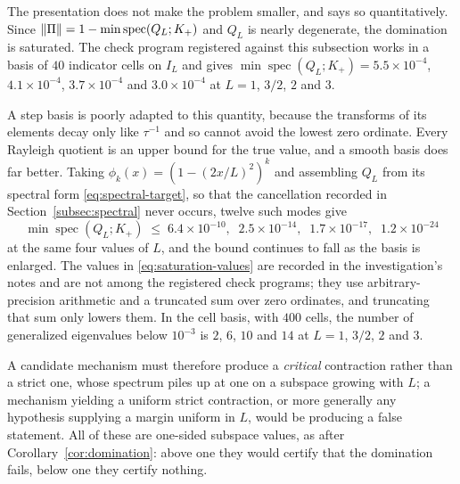 The presentation does not make the problem smaller, and says so
quantitatively. Since
$\lVert \Pi\rVert=1-\min\operatorname{spec}(Q_L;K_+)$ and $Q_L$ is nearly degenerate,
the domination is saturated. The check program registered against this
subsection works in a basis of $40$ indicator cells on $I_L$ and gives
$\min\operatorname{spec}(Q_L;K_+)=5.5\times10^{-4}$, $4.1\times10^{-4}$,
$3.7\times10^{-4}$ and $3.0\times10^{-4}$ at $L=1$, $3/2$, $2$ and $3$.

A step basis is poorly adapted to this quantity, because the transforms of its
elements decay only like $\tau^{-1}$ and so cannot avoid the lowest zero
ordinate. Every Rayleigh quotient is an upper bound for the true value, and a
smooth basis does far better. Taking $\phi_k(x)=(1-(2x/L)^2)^k$ and assembling
$Q_L$ from its spectral form \eqref{eq:spectral-target}, so that the
cancellation recorded in Section~\ref{subsec:spectral} never occurs, twelve
such modes give
\begin{equation}\label{eq:saturation-values}
 \min\operatorname{spec}(Q_L;K_+)\;\leq\;6.4\times10^{-10},\;\;
 2.5\times10^{-14},\;\; 1.7\times10^{-17},\;\; 1.2\times10^{-24}
\end{equation}
at the same four values of $L$, and the bound continues to fall as the basis is
enlarged. The values in \eqref{eq:saturation-values} are recorded in the
investigation's notes and are not among the registered check programs; they use
arbitrary-precision arithmetic and a truncated sum over zero ordinates, and
truncating that sum only lowers them. In the cell basis, with $400$ cells, the
number of generalized eigenvalues below $10^{-3}$ is $2$, $6$, $10$ and $14$ at
$L=1$, $3/2$, $2$ and $3$.

A candidate mechanism must therefore produce a \emph{critical} contraction
rather than a strict one, whose spectrum piles up at one on a subspace growing
with $L$; a mechanism yielding a uniform strict contraction, or more generally
any hypothesis supplying a margin uniform in $L$, would be producing a false
statement. All of these are one-sided subspace values, as after
Corollary~\ref{cor:domination}: above one they would certify that the
domination fails, below one they certify nothing.


